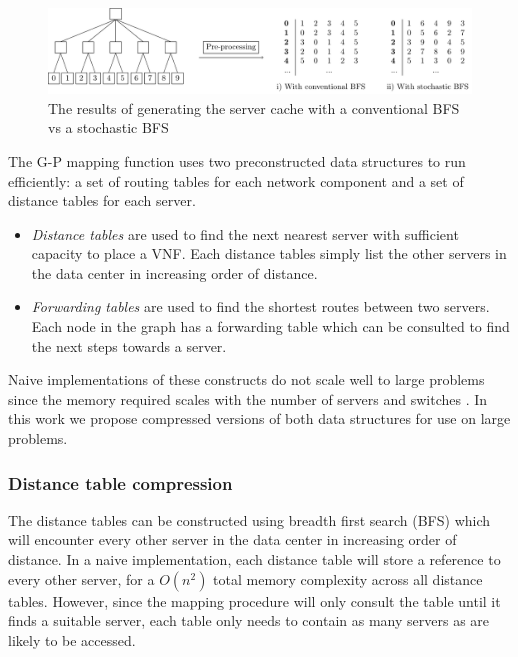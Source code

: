 \begin{figure}[t]
    \includegraphics[width=\textwidth]{figures/operators/preprocessing}

    \caption{The results of generating the server cache with a conventional BFS vs a stochastic BFS}
    \label{fig:server_gen}
\end{figure}

The G-P mapping function uses two preconstructed data structures to run efficiently: a set of routing tables for each network component and a set of distance tables for each server.
\begin{itemize}
    \item \textit{Distance tables} are used to find the next nearest server with sufficient capacity to place a VNF. Each distance tables simply list the other servers in the data center in increasing order of distance.
    \item \textit{Forwarding tables} are used to find the shortest routes between two servers. Each node in the graph has a forwarding table which can be consulted to find the next steps towards a server.
\end{itemize}

Naive implementations of these constructs do not scale well to large problems since the memory required scales with the number of servers and switches \cite{BillingsleyLMMG20}. In this work we propose compressed versions of both data structures for use on large problems.

\subsubsection{Distance table compression}
The distance tables can be constructed using breadth first search (BFS) which will encounter every other server in the data center in increasing order of distance. In a naive implementation, each distance table will store a reference to every other server, for a $O(n^2)$ total memory complexity across all distance tables. However, since the mapping procedure will only consult the table until it finds a suitable server, each table only needs to contain as many servers as are likely to be accessed.

